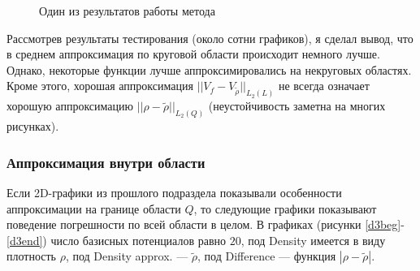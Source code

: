\documentclass[a4paper, 12pt]{article}
\begin{document}
                  \begin{figure}[h] 
                    \vfill 
                    \caption{Один из результатов работы метода} 
                    \label{hexampl} 
                    \end{figure}                                        

Рассмотрев результаты тестирования (около сотни графиков), я сделал вывод, что в среднем аппроксимация по круговой области происходит немного лучше.
Однако, некоторые функции лучше аппроксимировались на некруговых областях.
Кроме этого, хорошая аппроксимация $||V_f-V_{\tilde{\rho} } ||_{L_2(L)}$ не всегда означает хорошую аппроксимацию $||\rho-\tilde{\rho} ||_{L_2(Q)}$ (неустойчивость заметна на многих рисунках).%

\FloatBarrier 
\subsubsection{Аппроксимация внутри области}
Если 2D-графики из прошлого подраздела показывали особенности аппроксимации на границе области $Q$, то следующие графики показывают поведение погрешности по всей области в целом.
В графиках (рисунки \ref{d3beg}-\ref{d3end}) число базисных потенциалов равно $20$, под Density имеется в виду плотность $\rho$, под Density approx. --- $\tilde{\rho}$, под Difference --- функция $|\rho-\tilde{\rho}|$.
\end{document}
